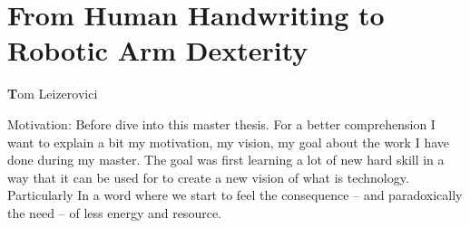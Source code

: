 \vspace*{4cm}
\chapter*{\centering \Huge From Human Handwriting to
Robotic Arm Dexterity}
{\centering \textbf Tom Leizerovici}

Motivation: Before dive into this master thesis. For a better comprehension I want to explain a bit my motivation, my vision, my goal about the work I have done during my master. The goal was first learning a lot of new hard skill in a way that it can be used for to create a new vision of what is technology. Particularly In a word where we start to feel the consequence -- and paradoxically the need -- of less energy and resource. 



\pagebreak